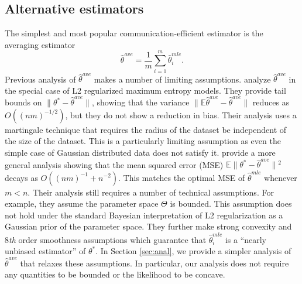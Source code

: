 \documentclass[twoside]{article}
\newcommand{\E}{\mathbb{E}}
\newcommand{\w}{\theta}
\newcommand{\wave}{\hat\w^{ave}}
\newcommand{\wmle}{\hat\w^{mle}}
\newcommand{\wstar}{{\w^{*}}}
\newcommand{\ltwo}[1]{{\lVert {#1} \rVert}}
\begin{document}
\subsection{Alternative estimators}
\label{sec:alt}
The simplest and most popular communication-efficient estimator is the averaging estimator
\begin{equation}
\wave = \frac{1}{m}\sum_{i=1}^m \wmle_i
.
\end{equation}
Previous analysis of $\wave$ makes a number of limiting assumptions.
\cite{mcdonald2009efficient} analyze $\wave$ in the special case of L2 regularized maximum entropy models.
They provide tail bounds on $\ltwo{\wstar-\wave}$, showing that the variance $\ltwo{\E\wave-\wave}$ reduces as $O((nm)^{-1/2})$,
but they do not show a reduction in bias.
Their analysis uses a martingale technique that requires the radius of the dataset be independent of the size of the dataset.
This is a particularly limiting assumption as even the simple case of Gaussian distributed data does not satisfy it.
\cite{zhang2012communication} provide a more general analysis showing that the mean squared error (MSE) $\E\ltwo{\wstar-\wave}{}^2$ decays as $O((nm)^{-1} + n^{-2})$.
This matches the optimal MSE of $\wmle$ whenever $m<n$.
Their analysis still requires a number of technical assumptions.
For example, they assume the parameter space $\Theta$ is bounded.
This assumption does not hold under the standard Bayesian interpretation of L2 regularization as a Gaussian prior of the parameter space.
They further make strong convexity and 8\emph{th} order smoothness assumptions which guarantee that $\wmle_i$ is a ``nearly unbiased estimator'' of $\wstar$.
In Section \ref{sec:anal}, we provide a simpler analysis of $\wave$ that relaxes these assumptions.
In particular, our analysis does not require any quantities to be bounded or the likelihood to be concave.
\end{document}
